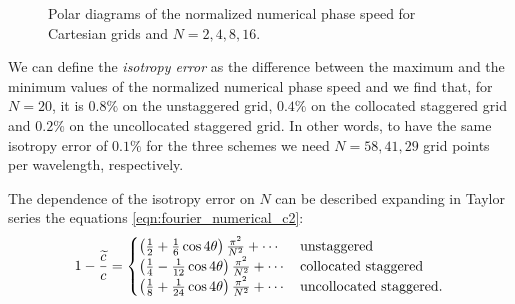 \begin{figure}[htbp]
  \begin{center}
  \end{center}
  \caption{Polar diagrams of the normalized numerical phase speed for
    Cartesian grids and $N = 2, 4, 8, 16$.}
  \label{fig:numerical_c_polar}
\end{figure}  

We can define the \emph{isotropy error} as the difference between the
maximum and the minimum values of the normalized numerical phase speed
and we find that, for $N = 20$, it is $0.8\%$ on the unstaggered grid,
$0.4\%$ on the collocated staggered grid and $0.2\%$ on the uncollocated
staggered grid. In other words, to have the same isotropy error of
$0.1\%$ for the three schemes we need $N = 58, 41, 29$ grid points per
wavelength, respectively.

The dependence of the isotropy error on $N$ can be described expanding
in Taylor series the equations \eqref{eqn:fourier_numerical_c2}:
\begin{equation*}
  1-\frac{\widetilde{c}}{c} = \begin{cases}
    \left( \frac{1}{2}  + \frac{1}{6} \cos 4\theta \right) \frac{\pi^2}{N^2} +
    \dotsb & \text{unstaggered} \\
    \left( \frac{1}{4}  - \frac{1}{12} \cos 4\theta \right) \frac{\pi^2}{N^2} +
    \dotsb & \text{collocated staggered} \\
    \left( \frac{1}{8}  + \frac{1}{24} \cos 4\theta \right) \frac{\pi^2}{N^2} +
    \dotsb & \text{uncollocated staggered} .
    \end{cases}
\end{equation*}

